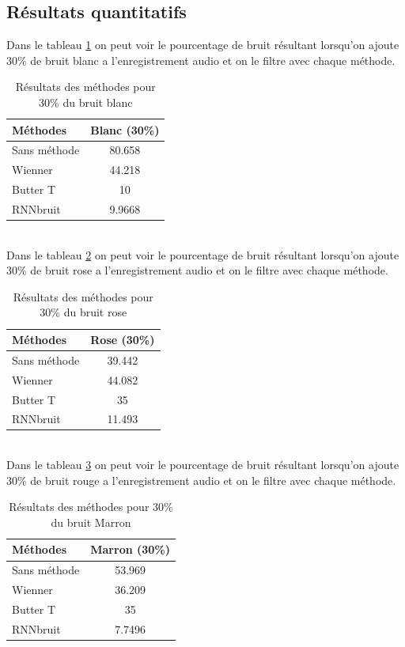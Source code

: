 \documentclass[conference,onecolumn]{IEEEtran}
\begin{document}
\subsection{Résultats quantitatifs}
Dans le tableau \ref{table:t1} on peut voir le pourcentage de bruit résultant lorsqu’on ajoute 30\% de bruit blanc a l’enregistrement audio et on le filtre avec chaque méthode.
\begin{table}[hbt!]
    \centering
    \begin{tabular}{ l  c }
    \textbf{Méthodes} & \textbf{Blanc (30\%)} \\
    \hline
    Sans méthode & 80.658 \\
    Wienner & 44.218 \\
    Butter T & 10 \\
    RNNbruit & 9.9668 \\
    \end{tabular}
    \caption{Résultats des méthodes pour 30\% du bruit blanc}
    \label{table:t1}
\end{table}
\hfill \\
Dans le tableau \ref{table:t2} on peut voir le pourcentage de bruit résultant lorsqu’on ajoute 30\% de bruit rose a l’enregistrement audio et on le filtre avec chaque méthode.
\begin{table}[hbt!]
    \centering
    \begin{tabular}{ l  c }
    \textbf{Méthodes} & \textbf{Rose (30\%)} \\
    \hline
    Sans méthode & 39.442 \\
    Wienner & 44.082 \\
    Butter T & 35 \\
    RNNbruit & 11.493 \\
    \end{tabular}
    \caption{Résultats des méthodes pour 30\% du bruit rose}
    \label{table:t2}
\end{table}
\hfill \\
Dans le tableau \ref{table:t3} on peut voir le pourcentage de bruit résultant lorsqu’on ajoute 30\% de bruit rouge a l’enregistrement audio et on le filtre avec chaque méthode.
\begin{table}[hbt!]
    \centering
    \begin{tabular}{ l  c }
    \textbf{Méthodes} & \textbf{Marron (30\%)} \\
    \hline
    Sans méthode & 53.969 \\
    Wienner & 36.209 \\
    Butter T & 35 \\
    RNNbruit & 7.7496 \\
    \end{tabular}
    \caption{Résultats des méthodes pour 30\% du bruit Marron}
    \label{table:t3}
\end{table}
\hfill \\
\end{document}

